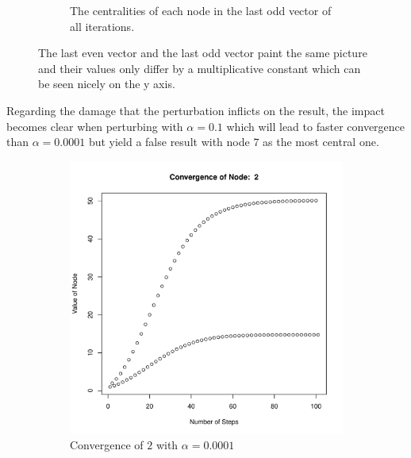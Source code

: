 \begin{figure}[H]
\begin{subfigure}[b]{.45\textwidth}
        \caption{The centralities of each node in the last odd vector of all iterations.}
        \label{fig:sub12}
    \end{subfigure}%
    \label{fig:evenVSodd}
    \caption{The last even vector and the last odd vector paint the same picture and their values
    only differ by a multiplicative constant which can be seen nicely on the y axis.}
\end{figure}

Regarding the damage that the perturbation inflicts on the result, the impact becomes clear when
perturbing with $\alpha =0.1$ which will lead to faster convergence than $\alpha = 0.0001$ but
yield a false result with node $7$ as the most central one.

\begin{figure}[H]
    \centering
    \begin{subfigure}[b]{.45\textwidth}
        \centering
        \includegraphics[width=\textwidth]{images/figures/convergence2.pdf}
        \caption{Convergence of $2$ with $\alpha = 0.0001$}
        \label{fig:sub22}
    \end{subfigure}
    \begin{subfigure}[b]{.45\textwidth}
        \centering

\end{subfigure}
\end{figure}
